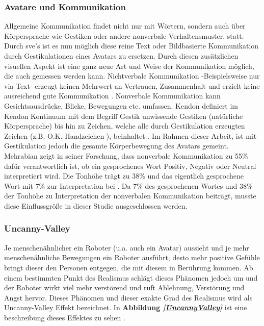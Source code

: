 \documentclass[a4paper,11pt]{article}%
\renewcommand{\\}{\vspace*{0.5\baselineskip} \newline}
\begin{document}
\subsubsection{Avatare und Kommunikation}
Allgemeine Kommunikation findet nicht nur mit Wörtern, sondern auch über Körpersprache wie Gestiken oder andere nonverbale Verhaltensmuster, statt. Durch \ac{sve}'s ist es nun möglich diese reine Text oder Bildbasierte Kommunikation durch Gestikulationen eines Avatars zu ersetzen. Durch diesen zusätzlichen visuellen Aspekt ist eine ganz neue Art und Weise der Kommunikation möglich, die auch gemessen werden kann. 
Nichtverbale Kommunikation -Beispielsweise nur via Text- erzeugt keinen Mehrwert an Vertrauen, Zusammenhalt und erzielt keine ausreichend gute Kommunikation \citep[p.81]{haslam2003social}.
Nonverbale Kommunikation kann Gesichtsausdrücke, Blicke, Bewegungen etc. umfassen. Kendon definiert im \dq{}Kendon Kontinuum\dq{} mit dem Begriff \dq{}Gestik\dq{} unwissende Gestiken (natürliche Körpersprache) bis hin zu \dq{} Zeichen\flqq, welche alle durch Gestikulation erzeugten Zeichen (z.B. O.K. Handzeichen ), beinhaltet \citep[37]{mcneill1992hand}.
Im Rahmen dieser Arbeit, ist mit Gestikulation jedoch die gesamte Körperbewegung des Avatars gemeint.
Mehrabian zeigt in seiner Forschung, dass nonverbale Kommunikation zu 55\% dafür verantwortlich ist, ob ein gesprochenes Wort Positiv, Negativ oder Neutral interpretiert wird. Die Tonhöhe trägt zu 38\% und das eigentlich gesprochene Wort mit 7\% zur Interpretation bei \citep[43]{mehrabian1971silent}.
Da 7\% des gesprochenen Wortes und 38\% der Tonhöhe zu Interpretation der nonverbalen Kommunikation beiträgt, musste diese Einflussgröße in dieser Studie ausgeschlossen werden.

\subsubsection{Uncanny-Valley}
\label{Uncanny-Valley}
Je menschenähnlicher ein Roboter (u.a. auch ein Avatar) aussieht und je mehr menschenähnliche Bewegungen ein Roboter ausführt, desto mehr positive Gefühle bringt dieser den Personen entgegen, die mit diesem in Berührung kommen. Ab einem bestimmten Punkt des Realismus schlägt dieses Phänomen jedoch um und der Roboter wirkt viel mehr verstörend und ruft  Ablehnung, Verstörung und Angst hervor. Dieses Phänomen und dieser exakte Grad des Realismus wird als Uncanny-Valley Effekt bezeichnet. In \textbf{Abbildung \textit{\ref{UncannyValley}}} ist eine beschreibung dieses Effektes zu sehen \citep[p.352-353]{gast2011unheimliche}.
\end{document}
